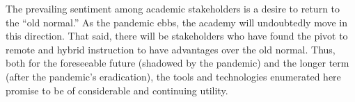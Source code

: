 \documentclass{article}
\begin{document}
The prevailing sentiment
among academic stakeholders
is a desire to return to the ``old normal.''
As the pandemic ebbs,
the academy will undoubtedly move
in this direction.
That said,
there will be stakeholders
who have found the
pivot to remote and hybrid instruction
to have advantages over the old normal.
Thus,
both for the foreseeable future
(shadowed by the pandemic)
and the longer term
(after the pandemic's eradication),
the tools and technologies
enumerated here
promise to be of
considerable and continuing
utility.

\hfill\square

\end{document}
